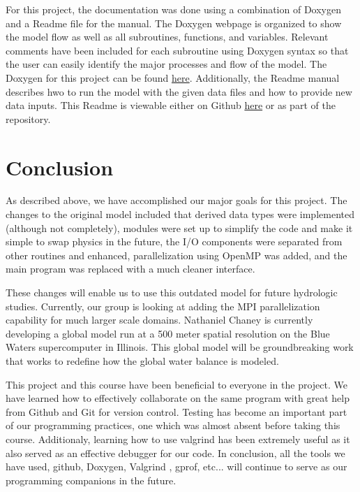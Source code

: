 \documentclass[pdftex,12pt,a4paper]{article}
\begin{document}
For this project, the documentation was done using a combination of Doxygen and a Readme file for the manual. The Doxygen webpage is organized to show the model flow as well as all subroutines, functions, and variables. Relevant comments have been included for each subroutine using Doxygen syntax so that the user can easily identify the major processes and flow of the model. The Doxygen for this project can be found \href{http://hydrology.princeton.edu/~nchaney/TOPLATS_HTML/index.html}{here}. Additionally, the Readme manual describes hwo to run the model with the given data files and how to provide new data inputs. This Readme is viewable either on Github \href{https://github.com/chaneyn/TOPLATS/wiki/Manual}{here} or as part of the repository.

\section{Conclusion}

As described above, we have accomplished our major goals for this project. The changes to the original model included that derived data types were implemented (although not completely), modules were set up to simplify the code and make it simple to swap physics in the future, the I/O components were separated from other routines and enhanced, parallelization using OpenMP was added, and the main program was replaced with a much cleaner interface. 

\vspace{1em}
These changes will enable us to use this outdated model for future hydrologic studies. Currently, our group is looking at adding the MPI parallelization capability for much larger scale domains. Nathaniel Chaney is currently developing a global model run at a 500 meter spatial resolution on the Blue Waters supercomputer in Illinois. This global model will be groundbreaking work that works to redefine how the global water balance is modeled.

This project and this course have been beneficial to everyone in the project. We have learned how to effectively collaborate on the same program with great help from Github and Git for version control. Testing has become an important part of our programming practices, one which was almost absent before taking this course. Additionaly, learning how to use valgrind has been extremely useful as it also served as an effective debugger for our code. In conclusion, all the tools we have used, github, Doxygen, Valgrind , gprof, etc... will continue to serve as our programming companions in the future.
\end{document}
